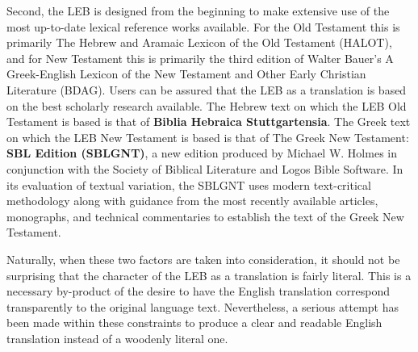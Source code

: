 Second, the LEB is designed from the beginning to make extensive use of the most up-to-date lexical reference works 
available. For the Old Testament this is primarily The Hebrew and Aramaic Lexicon of the Old Testament (HALOT), and for 
New Testament this is primarily the third edition of Walter Bauer's A Greek-English Lexicon of the New Testament and 
Other Early Christian Literature (BDAG). Users can be assured that the LEB as a translation is based on the best scholarly 
research available. The Hebrew text on which the LEB Old Testament is based is that of \textbf{Biblia Hebraica Stuttgartensia}. 
The Greek text on which the LEB New Testament is based is that of The Greek New Testament: \textbf{SBL Edition (SBLGNT)}, a new 
edition produced by Michael W. Holmes in conjunction with the Society of Biblical Literature and Logos Bible Software. 
In its evaluation of textual variation, the SBLGNT uses modern text-critical methodology along with guidance from the 
most recently available articles, monographs, and technical commentaries to establish the text of the Greek New Testament.\par

Naturally, when these two factors are taken into consideration, it should not be surprising that the character of the LEB 
as a translation is fairly literal. This is a necessary by-product of the desire to have the English translation correspond 
transparently to the original language text. Nevertheless, a serious attempt has been made within these constraints to produce 
a clear and readable English translation instead of a woodenly literal one.\par

